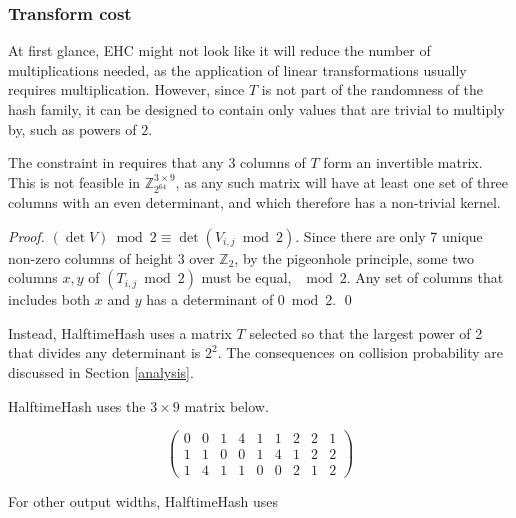 \documentclass[runningheads]{llncs}
\newcommand{\ints}{\mathbb{Z}}
\begin{document}

\subsubsection{Transform cost}

At first glance, EHC might not look like it will reduce the number of multiplications needed, as the application of linear transformations usually requires multiplication.
However, since $T$ is not part of the randomness of the hash family, it can be designed to contain only values that are trivial to multiply by, such as powers of $2$.

The constraint in \cite{ehc-nandi} requires that any 3 columns of $T$ form an invertible matrix.
This is not feasible in $\ints_{2^{64}}^{3 \times 9}$, as any such matrix will have at least one set of three columns with an even determinant, and which therefore has a non-trivial kernel.

\begin{proof}
  $(\det V) \bmod 2 \equiv \det \left( V_{i,j} \bmod 2 \right)$.
  Since there are only 7 unique non-zero columns of height 3 over $\ints_2$, by the pigeonhole principle, some two columns $x, y$ of $\left( T_{i,j} \bmod 2 \right)$ must be equal, $\!\!\!\!\mod 2$.
  Any set of columns that includes both $x$ and $y$ has a determinant of $0 \bmod 2$.
  \qed
\end{proof}

Instead, HalftimeHash uses a matrix $T$ selected so that the largest power of 2 that divides any determinant is $2^2$.
The consequences on collision probability are discussed in Section \ref{analysis}.

HalftimeHash uses the $3 \times 9$ matrix below.

\begin{displaymath}
  \left(
\begin{array}{rrrrrrrrr}
  0 & 0 & 1 & 4 & 1 & 1 & 2 & 2 & 1\\
  1 & 1 & 0 & 0 & 1 & 4 & 1 & 2 & 2\\
  1 & 4 & 1 & 1 & 0 & 0 & 2 & 1 & 2
\end{array}
\right)
\end{displaymath}

For other output widths, HalftimeHash uses
\end{document}
